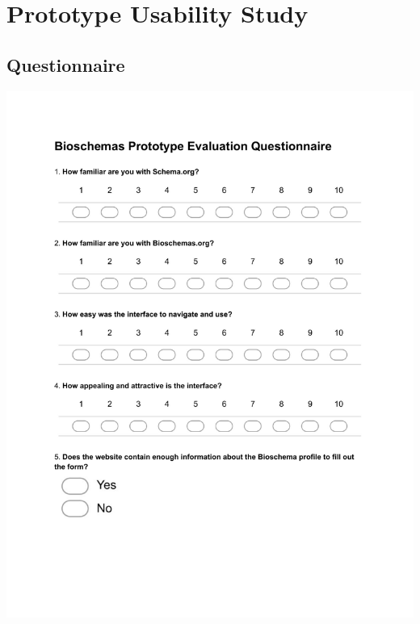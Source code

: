 \appendix
\chapter{Prototype Usability Study} 

\newpage
\section{Questionnaire}\label{chp:prototypeUsabilityQuestionaire}
\vspace*{3.7em}
\begin{centering}
\includegraphics[trim = 40 160 0 60,scale=0.9]{forms/prototypeEvaluationFormPage1.pdf}
\end{centering}

